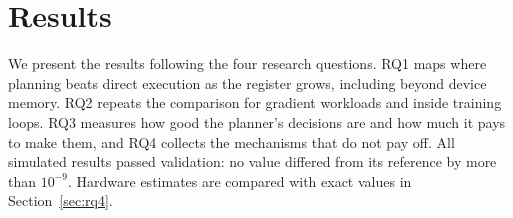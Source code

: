 \section{Results}
\label{sec:evaluation}
We present the results following the four research questions. RQ1 maps where planning beats direct execution as the register grows, including beyond device memory. RQ2 repeats the comparison for gradient workloads and inside training loops. RQ3 measures how good the planner's decisions are and how much it pays to make them, and RQ4 collects the mechanisms that do not pay off. All simulated results passed validation: no value differed from its reference by more than $10^{-9}$. Hardware estimates are compared with exact values in Section~\ref{sec:rq4}.





